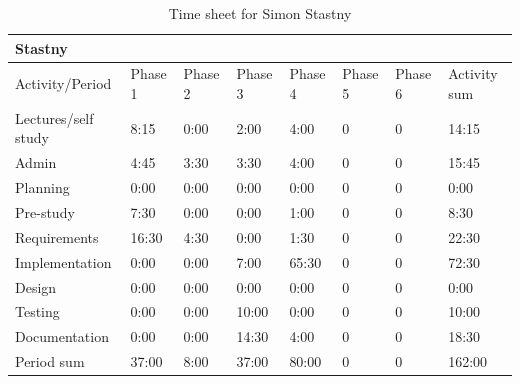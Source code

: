 \documentclass[11pt]{book}
\begin{document}
\begin{table}[H]
\centering
\begin{tabular}{| l | l | l | l | l | l | l | l |}
    \hline
    Stastny             &          &          &          &          &             &             &              \\ \hline          
    Activity/Period     & Phase 1  & Phase 2  & Phase  3 & Phase 4  & Phase 5     & Phase 6     & Activity sum \\ \hline
    Lectures/self study & 8:15     & 0:00     & 2:00     & 4:00     & 0           & 0           & 14:15        \\ \hline
    Admin               & 4:45     & 3:30     & 3:30     & 4:00     & 0           & 0           & 15:45        \\ \hline
    Planning            & 0:00     & 0:00     & 0:00     & 0:00     & 0           & 0           & 0:00         \\ \hline
    Pre-study           & 7:30     & 0:00     & 0:00     & 1:00     & 0           & 0           & 8:30         \\ \hline
    Requirements        & 16:30    & 4:30     & 0:00     & 1:30     & 0           & 0           & 22:30        \\ \hline
    Implementation      & 0:00     & 0:00     & 7:00     & 65:30    & 0           & 0           & 72:30        \\ \hline
    Design              & 0:00     & 0:00     & 0:00     & 0:00     & 0           & 0           & 0:00         \\ \hline
    Testing             & 0:00     & 0:00     & 10:00    & 0:00     & 0           & 0           & 10:00        \\ \hline
    Documentation       & 0:00     & 0:00     & 14:30    & 4:00     & 0           & 0           & 18:30        \\ \hline
    Period sum          & 37:00    & 8:00     & 37:00    & 80:00    & 0           & 0           & 162:00       \\ \hline
\end{tabular}
\caption{Time sheet for Simon Stastny}
\label{tab:appendix_timesheets_simon}
\end{table}
\end{document}
